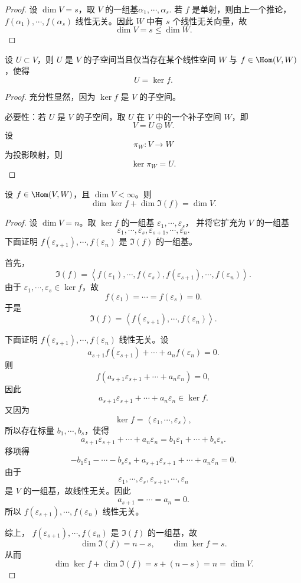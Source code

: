 \begin{proof}
	设 $\dim V=s$，取 $V$ 的一组基$\alpha_1,\cdots,\alpha_s. $
	若 $f$ 是单射，则由上一个推论，$ f(\alpha_1),\cdots,f(\alpha_s)$
	线性无关。因此 $W$ 中有 $s$ 个线性无关向量，故
	\[
	\dim V=s\leq \dim W.
	\]
\end{proof}

\begin{corollary}
	设 $U\subset V$，则 $U$ 是 $V$ 的子空间当且仅当存在某个线性空间 $W$ 与
	$f\in\Hom(V,W)$，使得
	\[
	U=\ker f.
	\]
\end{corollary}

\begin{proof}
	充分性显然，因为 $\ker f$ 是 $V$ 的子空间。
	
	必要性：若 $U$ 是 $V$ 的子空间，取 $U$ 在 $V$ 中的一个补子空间 $W$，即
	\[
	V=U\oplus W.
	\]
	设
	\[
	\pi_W:V\longrightarrow W
	\]
	为投影映射，则
	\[
	\ker \pi_W=U.
	\]
\end{proof}

\begin{theorem}
	设 $f\in\Hom(V,W)$，且 $\dim V<\infty$。则
	\[
	\dim\ker f+\dim\Im(f)=\dim V.
	\]
\end{theorem}

\begin{proof}
	设 $\dim V=n$。取 $\ker f$ 的一组基
	$\varepsilon_1,\cdots,\varepsilon_s$，
	并将它扩充为 $V$ 的一组基
	\[
	\varepsilon_1,\cdots,\varepsilon_s,
	\varepsilon_{s+1},\cdots,\varepsilon_n.
	\]
	下面证明
	$f(\varepsilon_{s+1}),\cdots,f(\varepsilon_n)$
	是 $\Im(f)$ 的一组基。
	
	首先，
	\[
	\Im(f)
	=\left\langle f(\varepsilon_1),\cdots,f(\varepsilon_s),
	f(\varepsilon_{s+1}),\cdots,f(\varepsilon_n)\right\rangle.
	\]
	由于 $\varepsilon_1,\cdots,\varepsilon_s\in\ker f$，故
	\[
	f(\varepsilon_1)=\cdots=f(\varepsilon_s)=0.
	\]
	于是
	\[
	\Im(f)
	=\left\langle f(\varepsilon_{s+1}),\cdots,f(\varepsilon_n)\right\rangle.
	\]
	
	下面证明
	$f(\varepsilon_{s+1}),\cdots,f(\varepsilon_n)$
	线性无关。设
	\[
	a_{s+1}f(\varepsilon_{s+1})+\cdots+a_nf(\varepsilon_n)=0.
	\]
	则
	\[
	f(a_{s+1}\varepsilon_{s+1}+\cdots+a_n\varepsilon_n)=0,
	\]
	因此
	\[
	a_{s+1}\varepsilon_{s+1}+\cdots+a_n\varepsilon_n\in\ker f.
	\]
	又因为
	\[
	\ker f=\left\langle \varepsilon_1,\cdots,\varepsilon_s\right\rangle,
	\]
	所以存在标量 $b_1,\cdots,b_s$，使得
	\[
	a_{s+1}\varepsilon_{s+1}+\cdots+a_n\varepsilon_n
	=b_1\varepsilon_1+\cdots+b_s\varepsilon_s.
	\]
	移项得
	\[
	-b_1\varepsilon_1-\cdots-b_s\varepsilon_s
	+a_{s+1}\varepsilon_{s+1}+\cdots+a_n\varepsilon_n=0.
	\]
	由于
	\[
	\varepsilon_1,\cdots,\varepsilon_s,
	\varepsilon_{s+1},\cdots,\varepsilon_n
	\]
	是 $V$ 的一组基，故线性无关。因此
	\[
	a_{s+1}=\cdots=a_n=0.
	\]
	所以
	$f(\varepsilon_{s+1}),\cdots,f(\varepsilon_n)$
	线性无关。
	
	综上，
	$f(\varepsilon_{s+1}),\cdots,f(\varepsilon_n)$
	是 $\Im(f)$ 的一组基，故
	\[
	\dim\Im(f)=n-s,
	\qquad
	\dim\ker f=s.
	\]
	从而
	\[
	\dim\ker f+\dim\Im(f)=s+(n-s)=n=\dim V.
	\]
\end{proof}

